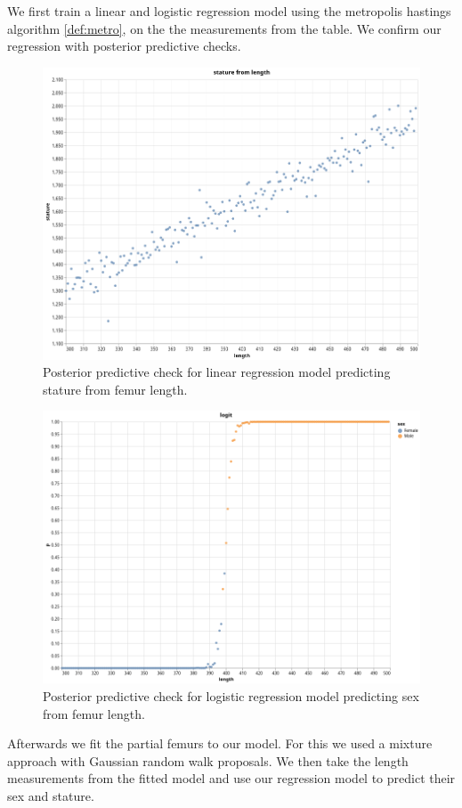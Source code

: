 \documentclass[10pt]{article}
\theoremstyle{definition}
\begin{document}
\noindent
We first train a linear and logistic regression model using the metropolis hastings algorithm \ref{def:metro}, on the the measurements from the table. We confirm our regression with posterior predictive checks.

\begin{figure}[h!]
\includegraphics[scale=0.4]{ppc_linear_scatter.png}
\centering
\caption{Posterior predictive check for linear regression model predicting stature from femur length.}
\label{fig:3}
\end{figure}

\begin{figure}[h!]
\includegraphics[scale=0.4]{ppc_logistic_scatter.png}
\centering
\caption{Posterior predictive check for logistic regression model predicting sex from femur length.}
\label{fig:4}
\end{figure}
\noindent
Afterwards we fit the partial femurs to our model. For this we used a mixture approach with Gaussian random walk proposals.
We then take the length measurements from the fitted model and use our regression model to predict their sex and stature.
\end{document}

